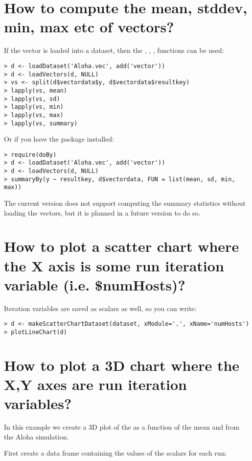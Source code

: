 \section{How to compute the mean, stddev, min, max etc of vectors?}

If the vector is loaded into a dataset, then the , , , 
functions can be used:

\begin{verbatim}
> d <- loadDataset('Aloha.vec', add('vector'))
> d <- loadVectors(d, NULL)
> vs <- split(d$vectordata$y, d$vectordata$resultkey)
> lapply(vs, mean)
> lapply(vs, sd)
> lapply(vs, min)
> lapply(vs, max)
> lapply(vs, summary)
\end{verbatim}

Or if you have the  package installed:

\begin{verbatim}
> require(doBy)
> d <- loadDataset('Aloha.vec', add('vector'))
> d <- loadVectors(d, NULL)
> summaryBy(y ~ resultkey, d$vectordata, FUN = list(mean, sd, min, max))
\end{verbatim}

The current version does not support computing the summary statistics without loading the vectors,
but it is planned in a future version to do so.

\section{How to plot a scatter chart where the X axis is some run iteration
variable (i.e. \$numHosts)?}

Iteration variables are saved as scalars as well, so you can write:

\begin{verbatim}
> d <- makeScatterChartDataset(dataset, xModule='.', xName='numHosts')
> plotLineChart(d)
\end{verbatim}

\section{How to plot a 3D chart where the X,Y axes are run iteration variables?}

In this example we create a 3D plot of the  as a function
of the mean  and  from the Aloha simulation.

First create a data frame containing the values of the scalars for each run:
 
